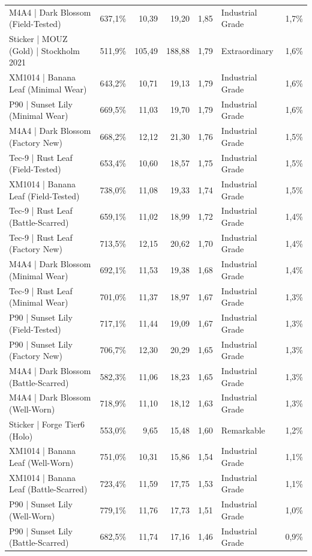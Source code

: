 \begin{longtable}{@{\extracolsep{\fill}}lrrrrlr}
M4A4 | Dark Blossom (Field-Tested) & 637,1\% & 10,39 & 19,20 & 1,85 & Industrial Grade & 1,7\% \\
Sticker | MOUZ (Gold) | Stockholm 2021 & 511,9\% & 105,49 & 188,88 & 1,79 & Extraordinary & 1,6\% \\
XM1014 | Banana Leaf (Minimal Wear) & 643,2\% & 10,71 & 19,13 & 1,79 & Industrial Grade & 1,6\% \\
P90 | Sunset Lily (Minimal Wear) & 669,5\% & 11,03 & 19,70 & 1,79 & Industrial Grade & 1,6\% \\
M4A4 | Dark Blossom (Factory New) & 668,2\% & 12,12 & 21,30 & 1,76 & Industrial Grade & 1,5\% \\
Tec-9 | Rust Leaf (Field-Tested) & 653,4\% & 10,60 & 18,57 & 1,75 & Industrial Grade & 1,5\% \\
XM1014 | Banana Leaf (Field-Tested) & 738,0\% & 11,08 & 19,33 & 1,74 & Industrial Grade & 1,5\% \\
Tec-9 | Rust Leaf (Battle-Scarred) & 659,1\% & 11,02 & 18,99 & 1,72 & Industrial Grade & 1,4\% \\
Tec-9 | Rust Leaf (Factory New) & 713,5\% & 12,15 & 20,62 & 1,70 & Industrial Grade & 1,4\% \\
M4A4 | Dark Blossom (Minimal Wear) & 692,1\% & 11,53 & 19,38 & 1,68 & Industrial Grade & 1,4\% \\
Tec-9 | Rust Leaf (Minimal Wear) & 701,0\% & 11,37 & 18,97 & 1,67 & Industrial Grade & 1,3\% \\
P90 | Sunset Lily (Field-Tested) & 717,1\% & 11,44 & 19,09 & 1,67 & Industrial Grade & 1,3\% \\
P90 | Sunset Lily (Factory New) & 706,7\% & 12,30 & 20,29 & 1,65 & Industrial Grade & 1,3\% \\
M4A4 | Dark Blossom (Battle-Scarred) & 582,3\% & 11,06 & 18,23 & 1,65 & Industrial Grade & 1,3\% \\
M4A4 | Dark Blossom (Well-Worn) & 718,9\% & 11,10 & 18,12 & 1,63 & Industrial Grade & 1,3\% \\
Sticker | Forge Tier6 (Holo) & 553,0\% & 9,65 & 15,48 & 1,60 & Remarkable & 1,2\% \\
XM1014 | Banana Leaf (Well-Worn) & 751,0\% & 10,31 & 15,86 & 1,54 & Industrial Grade & 1,1\% \\
XM1014 | Banana Leaf (Battle-Scarred) & 723,4\% & 11,59 & 17,75 & 1,53 & Industrial Grade & 1,1\% \\
P90 | Sunset Lily (Well-Worn) & 779,1\% & 11,76 & 17,73 & 1,51 & Industrial Grade & 1,0\% \\
P90 | Sunset Lily (Battle-Scarred) & 682,5\% & 11,74 & 17,16 & 1,46 & Industrial Grade & 0,9\% \\

\end{longtable}
